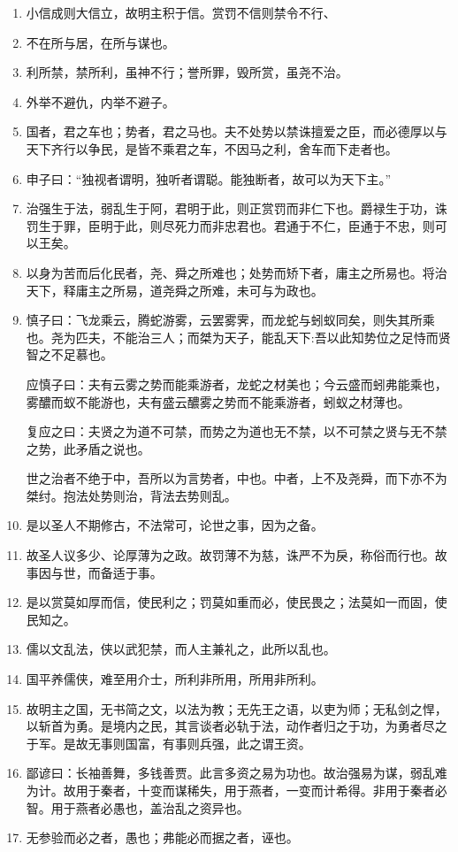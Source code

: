\documentclass[UTF8]{ctexart}
\begin{document}
\begin{enumerate}
			\item 小信成则大信立，故明主积于信。赏罚不信则禁令不行、
			\item 不在所与居，在所与谋也。
			\item 利所禁，禁所利，虽神不行；誉所罪，毁所赏，虽尧不治。
			\item 外举不避仇，内举不避子。
			\item 国者，君之车也；势者，君之马也。夫不处势以禁诛擅爱之臣，而必德厚以与天下齐行以争民，是皆不乘君之车，不因马之利，舍车而下走者也。
			\item 申子曰：“独视者谓明，独听者谓聪。能独断者，故可以为天下主。”
			\item 治强生于法，弱乱生于阿，君明于此，则正赏罚而非仁下也。爵禄生于功，诛罚生于罪，臣明于此，则尽死力而非忠君也。君通于不仁，臣通于不忠，则可以王矣。
			\item 以身为苦而后化民者，尧、舜之所难也；处势而矫下者，庸主之所易也。将治天下，释庸主之所易，道尧舜之所难，未可与为政也。
			\item 慎子曰：飞龙乘云，腾蛇游雾，云罢雾霁，而龙蛇与蚓蚁同矣，则失其所乘也。尧为匹夫，不能治三人；而桀为天子，能乱天下:吾以此知势位之足恃而贤智之不足慕也。
			
				  应慎子曰：夫有云雾之势而能乘游者，龙蛇之材美也；今云盛而蚓弗能乘也，雾醲而蚁不能游也，夫有盛云醲雾之势而不能乘游者，蚓蚁之材薄也。
				  
				  复应之曰：夫贤之为道不可禁，而势之为道也无不禁，以不可禁之贤与无不禁之势，此矛盾之说也。
				  
				  世之治者不绝于中，吾所以为言势者，中也。中者，上不及尧舜，而下亦不为桀纣。抱法处势则治，背法去势则乱。
			\item 是以圣人不期修古，不法常可，论世之事，因为之备。
			\item 故圣人议多少、论厚薄为之政。故罚薄不为慈，诛严不为戾，称俗而行也。故事因与世，而备适于事。
			\item 是以赏莫如厚而信，使民利之；罚莫如重而必，使民畏之；法莫如一而固，使民知之。
			\item 儒以文乱法，侠以武犯禁，而人主兼礼之，此所以乱也。
			\item 国平养儒侠，难至用介士，所利非所用，所用非所利。
			\item 故明主之国，无书简之文，以法为教；无先王之语，以吏为师；无私剑之悍，以斩首为勇。是境内之民，其言谈者必轨于法，动作者归之于功，为勇者尽之于军。是故无事则国富，有事则兵强，此之谓王资。
			\item 鄙谚曰：长袖善舞，多钱善贾。此言多资之易为功也。故治强易为谋，弱乱难为计。故用于秦者，十变而谋稀失，用于燕者，一变而计希得。非用于秦者必智。用于燕者必愚也，盖治乱之资异也。
			\item 无参验而必之者，愚也；弗能必而据之者，诬也。
			
		\end{enumerate}
	
\end{document}
